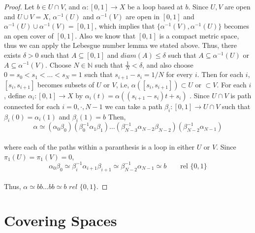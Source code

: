 \documentclass[paper=a4, fontsize=11pt]{scrartcl}
\begin{document}
\begin{proof}
	Let $b \in U \cap V$, and $\alpha : [0,1] \to X $ be a loop based at $b$. Since $U,V$ are open and $U \cup V = X$, $\alpha^{-1}(U)$ and $\alpha^{-1}(V)$ are open in $[0,1] $ and $\alpha^{-1}(U) \cup \alpha^{-1}(V) = [0,1]$, which implies that $\{ \alpha^{-1}(V) , \alpha^{-1}(U)\}$ becomes an open cover of $[0,1]$. Also we know that $[0,1]$ is a compact metric space, thus we can apply the Lebesgue number lemma we stated above. Thus, there exists $\delta > 0$ such that $A \subseteq [0,1]$ and $diam(A)\leq \delta$ such that $A \subseteq \alpha^{-1}(U)$ or $A \subseteq \alpha^{-1}(V)$. Choose $N \in \mathbb{N}$ such that $\frac{1}{N} < \delta$, and also choose $0= s_0 < s_1 < \dots < s_N=1$ such that $s_{i+1}-s_i=1/N$ for every $i$. Then for each $i$, $[s_i,s_{i+1}]$ becomes subsets of $U$ or $V$, i.e, $\alpha([s_i,s_{i+1}])\subset U$ or $\subset V$. For each $i$, define $\alpha_i : [0,1] \to X$ by $\alpha_i(t) = \alpha ((s_{i+1}-s_i)t+s_i)$ . Since $U \cap V$ is path connected for each $i=0, \cdot , N-1$ we can take a path $\beta_i : [0,1] \to U \cap V$ such that $\beta_i(0)= \alpha_i(1)$ and $\beta_i(1)=b$ Then,  \\
	
	\begin{equation}\nonumber
		\alpha \simeq (\alpha_0 \beta_0)(\beta_0^{-1}\alpha_1\beta_1) \dots (\beta_{N-3}^{-1}\alpha_{N-2}\beta_{N-2})(\beta_{N-2}^{-1}\alpha_{N-1})
	\end{equation}\\
	
	where each of the paths within a paranthesis is a loop in either $U$ or $V$. Since $\pi_1(U)=\pi_1(V)=0$, \\
	
	\begin{equation}\nonumber
		\alpha_0 \beta_0 \simeq \beta_i^{-1} \alpha_{i+1} \beta_{i+1} \simeq \beta_{N-2}^{-1} \alpha_{N-1} \simeq b \qquad \text{rel } \{0,1\}
	\end{equation}\\
	
	Thus, $\alpha \simeq b b \dots b b \simeq b $ $rel$ $\{0,1\}$. 
	
\end{proof}

\vspace{0.15in}
\section{Covering Spaces}
\vspace{0.15in}
\end{document}
